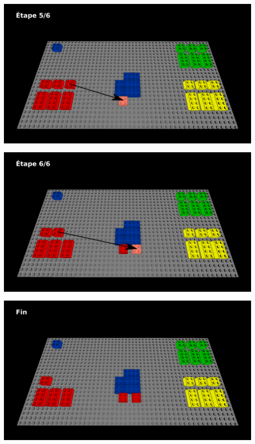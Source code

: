 \documentclass[aspectratio=169]{beamer}
\begin{document}
\begin{frame}
  \includegraphics[width=\linewidth]{step5.png}
\end{frame}

\begin{frame}
  \includegraphics[width=\linewidth]{step6.png}
\end{frame}

\begin{frame}
  \includegraphics[width=\linewidth]{end.png}
\end{frame}
\end{document}
